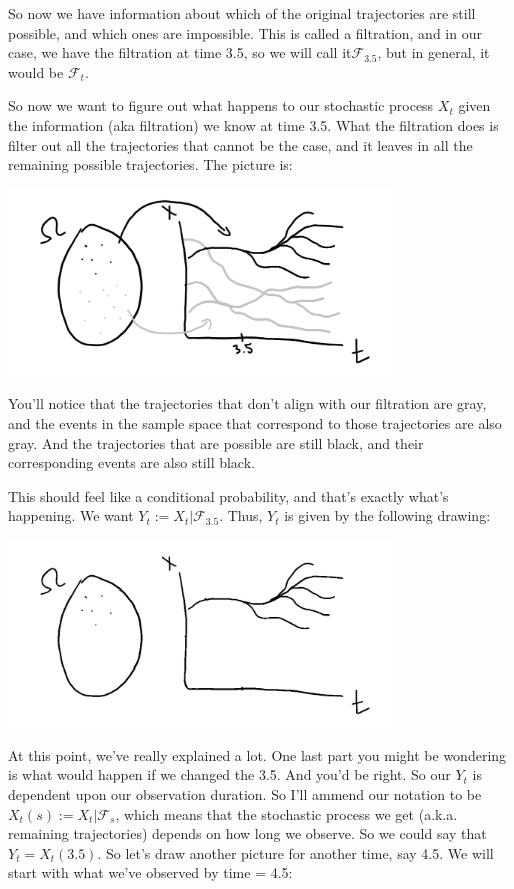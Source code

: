 \documentclass{article}
\begin{document}
So now we have information about which of the original trajectories are still possible, and which ones are impossible. This is called a filtration, and in our case, we have the filtration at time 3.5, so we will call it$\mathcal{F}_{3.5}$, but in general, it would be $\mathcal{F}_{t}$.

So now we want to figure out what happens to our stochastic process $X_t$ given the information (aka filtration) we know at time 3.5. What the filtration does is filter out all the trajectories that cannot be the case, and it leaves in all the remaining possible trajectories.  The picture is:

\includegraphics[width=4in]{filtration_part_3.png}
\centering

You'll notice that the trajectories that don't align with our filtration are gray, and the events in the sample space that correspond to those trajectories are also gray.  And the trajectories that are possible are still black, and their corresponding events are also still black.

This should feel like a conditional probability, and that's exactly what's happening. We want $Y_t := X_t | \mathcal{F}_{3.5}$.  Thus, $Y_t$ is given by the following drawing:

\includegraphics[width=4in]{filtration_part_4.png}
\centering

At this point, we've really explained a lot.  One last part you might be wondering is what would happen if we changed the 3.5.  And you'd be right. So our $Y_t$ is dependent upon our observation duration. So I'll ammend our notation to be $X_t(s) := X_t | \mathcal{F}_{s}$, which means that the stochastic process we get (a.k.a. remaining trajectories) depends on how long we observe.  So we could say that $Y_t = X_t(3.5)$.  So let's draw another picture for another time, say 4.5. We will start with what we've observed by time = 4.5:
\end{document}
